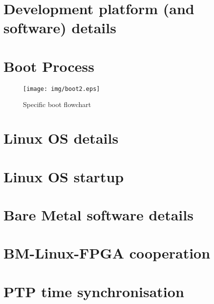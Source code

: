 \documentclass[twoside,a4paper]{refart}
\begin{document}
\newpage
\section{Development platform (and software) details}


\newpage
\section{Boot Process}

\begin{figure}[!htb]
\texttt{[image: img/boot2.eps]}

\caption{Specific boot flowchart}
\label{fig:boot_graph}
\end{figure}

\newpage
\section{Linux OS details}


\newpage
\section{Linux OS startup}


\newpage
\section{Bare Metal software details}


\newpage
\section{BM-Linux-FPGA cooperation}


\newpage
\section{PTP time synchronisation}
\end{document}
